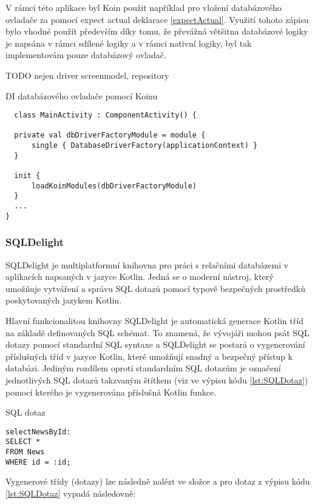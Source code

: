 \bigskip

V rámci této aplikace byl Koin použit například pro vložení databázového ovladače za pomocí expect actual deklarace \ref{expectActual}.
Využití tohoto zápisu bylo vhodné použít především díky tomu, že převážná většitna databázové logiky je napsána v rámci sdílené 
logiky a v rámci nativní logiky, byl tak implementovám pouze databázový ovladač.

TODO nejen driver screenmodel, repository
\begin{listing}[H]
\caption{DI databázového ovladače pomocí Koinu}\label{lst:KoinInit}
\begin{verbatim}
  class MainActivity : ComponentActivity() {

  private val dbDriverFactoryModule = module {
      single { DatabaseDriverFactory(applicationContext) }
  }

  init {
      loadKoinModules(dbDriverFactoryModule)
  }
  ...
}
\end{verbatim}
\end{listing}

\subsubsection*{SQLDelight}
SQLDelight je multiplatformní knihovna pro práci s relačními databázemi v aplikacích napsaných v jazyce Kotlin. Jedná se o moderní nástroj, 
který umožňuje vytváření a správu SQL dotazů pomocí typově bezpečných prostředků poskytovaných jazykem Kotlin.

Hlavní funkcionalitou knihovny SQLDelight je automatická generace Kotlin tříd na základě definovaných SQL schémat. To znamená, že vývojáři
 mohou psát SQL dotazy pomocí standardní SQL syntaxe a SQLDelight se postará o vygenerování příslušných tříd v jazyce Kotlin, které umožňují 
 snadný a bezpečný přístup k databázi. Jediným rozdílem oproti standardním SQL dotazům je označení jednotlivých SQL dotazů takzvaným 
 štítkem (viz  ve výpisu kódu \ref{lst:SQLDotaz}) pomocí kterého je vygenerována příslušná Kotlin funkce. 

\begin{listing}[H]
\caption{SQL dotaz}\label{lst:SQLDotaz}
\begin{verbatim}
selectNewsById:
SELECT *
FROM News
WHERE id = :id;
\end{verbatim}
\end{listing}


Vygenerové třídy (dotazy) lze následně nalézt ve složce  a pro dotaz z výpisu kódu \ref{lst:SQLDotaz}
vypadá následovně:

